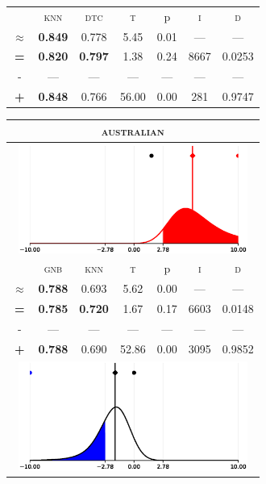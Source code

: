 \begin{tabular}{c||cc||c|c|c||c}
\midrule	&\textsc{knn} & \textsc{dtc} & \textsc{t} & p & \textsc{i} & \textsc{d}\\
	\color{red} $\approx$ & \color{red} \bfseries 0.849 &\color{red}   0.778 & 5.45 & 0.01 & --- & ---\\\midrule
	{\bfseries\color{black}\tiny=}& \color{black} \bfseries 0.820 & \color{black} \bfseries 0.797 & 1.38 & 0.24 & 8667 & \color{black} 0.0253\\
	{\tiny-}& --- & --- & --- & --- & --- & ---\\
	{\bfseries\color{red}\tiny+}& \color{red} \bfseries 0.848 & \color{red}  0.766 & 56.00 & 0.00 & 281 & \color{red} 0.9747\\
\bottomrule\end{tabular}


\begin{tabular}{c||cc||c|c|c||c}
	\toprule
	\multicolumn{7}{c}{\textsc{australian}}\\
	\bottomrule
	\multicolumn{7}{c}{\includegraphics[width=7.5cm, trim=30 0 30 0]{figures/australian_0.eps}}\\

\midrule	&\textsc{gnb} & \textsc{knn} & \textsc{t} & p & \textsc{i} & \textsc{d}\\
	\color{red} $\approx$ & \color{red} \bfseries 0.788 &\color{red}   0.693 & 5.62 & 0.00 & --- & ---\\\midrule
	{\bfseries\color{black}\tiny=}& \color{black} \bfseries 0.785 & \color{black} \bfseries 0.720 & 1.67 & 0.17 & 6603 & \color{black} 0.0148\\
	{\tiny-}& --- & --- & --- & --- & --- & ---\\
	{\bfseries\color{red}\tiny+}& \color{red} \bfseries 0.788 & \color{red}  0.690 & 52.86 & 0.00 & 3095 & \color{red} 0.9852\\
	\bottomrule
	\multicolumn{7}{c}{\includegraphics[width=7.5cm, trim=30 0 30 0]{figures/australian_1.eps}}\\


\end{tabular}
